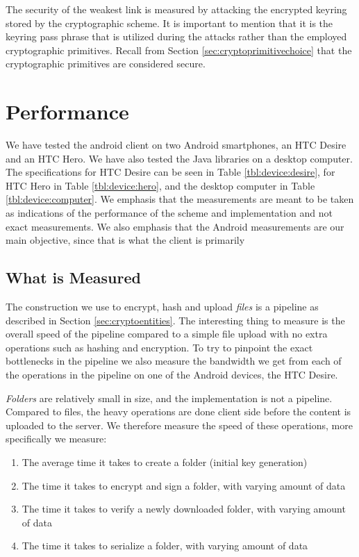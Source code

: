 \documentclass[pdftex,english,10pt,b5paper,twoside]{book}
\begin{document}
The security of the weakest link is measured by attacking the encrypted keyring
stored by the cryptographic scheme. It is important to mention that it is the
keyring pass phrase that is utilized during the attacks rather than the employed
cryptographic primitives. Recall from Section \ref{sec:cryptoprimitivechoice} that the
cryptographic primitives are considered secure. 

\section{Performance}

We have tested the android client on two Android smartphones, an HTC Desire and
an HTC Hero. We have also tested the Java libraries on a desktop computer. The
specifications for HTC Desire can be seen in Table \ref{tbl:device:desire}, for
HTC Hero in Table \ref{tbl:device:hero}, and the desktop computer in Table
\ref{tbl:device:computer}. We emphasis that the measurements are meant to be
taken as indications of the performance of the scheme and implementation and
not exact measurements. We also emphasis that the Android measurements are our
main objective, since that is what the client is primarily





\subsection{What is Measured}

The construction we use to encrypt, hash and upload \emph{files} is a pipeline
as described in Section \ref{sec:cryptoentities}. The interesting thing to
measure is the overall speed of the pipeline compared to a simple file upload
with no extra operations such as hashing and encryption. To try to pinpoint the
exact bottlenecks in the pipeline we also measure the bandwidth we get from
each of the operations in the pipeline on one of the Android devices, the HTC
Desire.

\emph{Folders} are relatively small in size, and the implementation is not a
pipeline. Compared to files, the heavy operations are done client side before
the content is uploaded to the server. We therefore measure the speed of these
operations, more specifically we measure:

\begin{enumerate}
    \item The average time it takes to create a folder (initial key generation)
    \item The time it takes to encrypt and sign a folder, with varying amount
        of data
    \item The time it takes to verify a newly downloaded folder, with varying
        amount of data
    \item The time it takes to serialize a folder, with varying amount of data
\end{enumerate}
\end{document}
